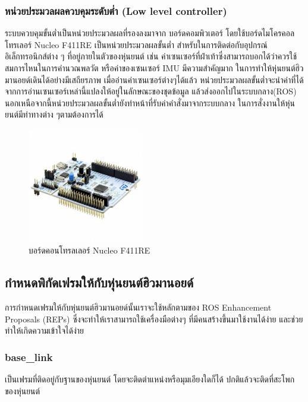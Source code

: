 \subsubsection{หน่วยประมวลผลควบคุมระดับต่ำ (Low level controller)}
ระบบควบคุมขั้นต่ำเป็นหน่วยประมวลผลที่รองลงมาจาก บอร์ดคอมพิวเตอร์ โดยใช้บอร์ดไมโครคอลโทรเลอร์ Nucleo F411RE
เป็นหน่วยประมวลผลขั้นต่ำ สำหรับในการติดต่อกับอุปกรณ์อิเล็กทรอนิกส์ต่าง ๆ ที่อยู่ภายในตัวของหุ่นยนต์ เช่น
ค่าเซนเซอร์ที่ฝ่าเท้าซึ่งสามารถบอกได้ว่าควรใช้สมการไหนในการคำนวณพลวัต หรือค่าของเซนเซอร์ IMU มีความสำคัญมาก
ในการทำให้หุ่นยนต์ฮิวมานอยด์เดินได้อย่างมีเสถียรภาพ เมื่ออ่านค่าเซนเซอร์ต่างๆได้แล้ว
หน่วยประมวลผลขั้นต่ำจะนำค่าที่ได้จากการอ่านเซนเซอร์เหล่านี้แปลงให้อยู่ในลักษณะของชุดข้อมูล แล้วส่งออกไปในระบบกลาง(ROS)
นอกเหนือจากนี้หน่วยประมวลผลขั้นต่ำยังทำหน้าที่รับค่าคำสั่งมาจากระบบกลาง ในการสั่งงานให้หุ่นยนต์มีท่าทางต่าง ๆตามต้องการได้

\begin{figure}[ht]
	\centering
	\includegraphics[width=0.45\textwidth]{chapter3/images/nucleo_f411re.jpeg}
	\caption{บอร์ดคอนโทรลเลอร์ Nucleo F411RE}
	\label{fig:controller_f411re}
\end{figure}

\clearpage
\subsection{กำหนดพิกัดเฟรมให้กับหุ่นยนต์ฮิวมานอยด์}
การกำหนดเฟรมให้กับหุ่นยนต์ฮิวมานอยด์นั้นเราจะใช้หลักตามของ ROS Enhancement Proposals (REPs) ซึ่งจะทำให้เราสามารถใช้เครื่องมือต่างๆ ที่มีคนสร้างขึ้นมาใช้งานได้ง่าย และช่วยทำให้เกิดความเข้าใจได้ง่าย

\subsubsection*{base\_link}
เป็นเฟรมที่ติดอยู่กับฐานของหุ่นยนต์ โดยจะติดตำแหน่งหรือมุมเอียงใดก็ได้ ปกติแล้วจะติดที่สะโพกของหุ่นยนต์

